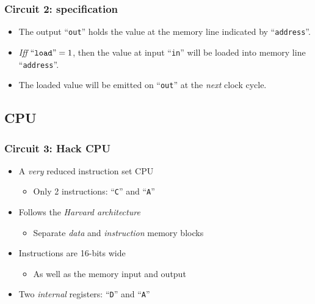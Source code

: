         \begin{frame}
            \frametitle{Circuit 2: specification}

            \begin{itemize}
                \item The output ``\texttt{out}'' holds the value at the memory line indicated by ``\texttt{address}''.
                \item \emph{Iff} $\text{``\texttt{load}''} = 1$,
                    then the value at input ``\texttt{in}'' will be loaded into memory line ``\texttt{address}''.
                \item The loaded value will be emitted on ``\texttt{out}'' at the \emph{next} clock cycle.
            \end{itemize}

        \end{frame}


    \subsection{CPU}
    \label{subsec:cpu}
        \begin{frame}
            \frametitle{Circuit 3: Hack CPU}

            \begin{itemize}
                \item A \emph{very} reduced instruction set CPU
                    \begin{itemize}
                        \item Only 2 instructions: ``\texttt{C}'' and ``\texttt{A}''
                    \end{itemize}
                \item Follows the \emph{Harvard architecture}
                    \begin{itemize}
                        \item Separate \emph{data} and \emph{instruction} memory blocks
                    \end{itemize}
                \item Instructions are 16-bits wide
                    \begin{itemize}
                        \item As well as the memory input and output
                    \end{itemize}
                \item Two \emph{internal} registers: ``\texttt{D}'' and ``\texttt{A}''
            \end{itemize}
        \end{frame}

